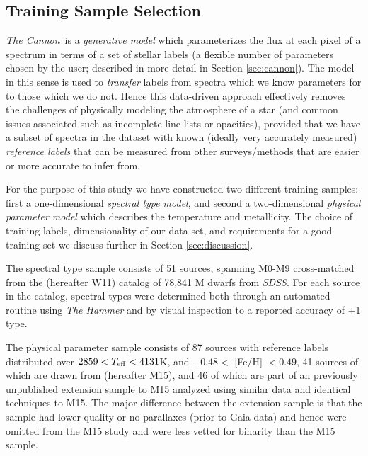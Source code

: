 \documentclass[modern]{aastex62}
\newcommand{\thecannon}{\textsl{The Cannon}}
\newcommand{\sdss}{\textsl{SDSS}}
\begin{document}
\subsection{Training Sample Selection}

\thecannon\ is a \emph{generative model} which parameterizes the flux at each pixel of a spectrum in terms of a set of stellar labels (a flexible number of parameters chosen by the user; described in more detail in Section \ref{sec:cannon}). The model in this sense is used to \emph{transfer} labels from spectra which we know parameters for to those which we do not. Hence this data-driven approach effectively removes the challenges of physically modeling the atmosphere of a star (and common issues associated such as incomplete line lists or opacities), provided that we have a subset of spectra in the dataset with known (ideally very accurately measured) \emph{reference labels} that can be measured from other surveys/methods that are easier or more accurate to infer from. 

For the purpose of this study we have constructed two different training samples: first a one-dimensional \emph{spectral type model}, and second a two-dimensional \emph{physical parameter model} which describes the temperature and metallicity. The choice of training labels, dimensionality of our data set, and requirements for a good training set we discuss further in Section \ref{sec:discussion}.

The spectral type sample consists of 51 sources, spanning M0-M9 cross-matched from the \citealt{West:2011} (hereafter W11) catalog of 78,841 M dwarfs from \sdss. For each source in the catalog, spectral types were determined both through an automated routine using \textsl{The Hammer} \citep{Covey:2007} and by visual inspection to a reported accuracy of $\pm$1 type.

The physical parameter sample consists of 87 sources with reference labels distributed over $2859 <T_{\rm eff} < 4131$K, and $-0.48 <$ [Fe/H] $< 0.49$, 41 sources of which are drawn from \citealt{Mann:2015} (hereafter M15), and 46 of which are part of an previously unpublished extension sample to M15 analyzed using similar data and identical techniques to M15. The major difference between the extension sample is that the sample had lower-quality or no parallaxes (prior to Gaia data) and hence were omitted from the M15 study and were less vetted for binarity than the M15 sample.
\end{document}
